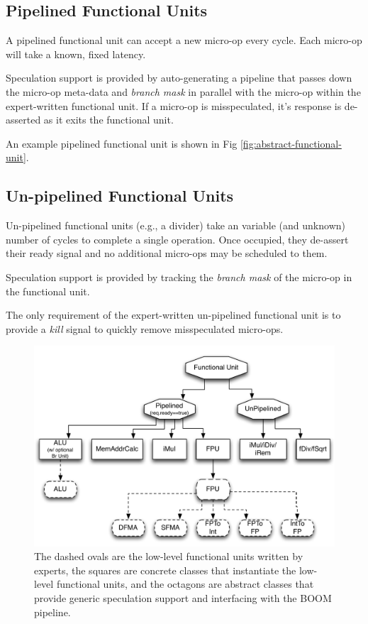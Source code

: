 \subsection{Pipelined Functional Units}

A pipelined functional unit can accept a new micro-op every cycle. Each micro-op will take a known, fixed latency. 

Speculation support is provided by auto-generating a pipeline that passes down the micro-op meta-data and {\em branch mask} in parallel with the micro-op within the expert-written functional unit. If a micro-op is misspeculated, it's response is de-asserted as it exits the functional unit. 

An example pipelined functional unit is shown in Fig \ref{fig:abstract-functional-unit}.

\subsection{Un-pipelined Functional Units}

Un-pipelined functional units (e.g., a divider) take an variable (and unknown) number of cycles to complete a single operation. Once occupied, they de-assert their ready signal and no additional micro-ops may be scheduled to them. 

Speculation support is provided by tracking the {\em branch mask} of the micro-op in the functional unit. 

The only requirement of the expert-written un-pipelined functional unit is to provide a {\em kill} signal to quickly remove misspeculated micro-ops.

\begin{figure}[htbp]
	\centering
	\centerline{\includegraphics[scale =0.75] {figures/functional-unit-hierarchy}}
	\caption{ \small The dashed ovals are the low-level functional units written by experts, the squares are concrete classes that instantiate the low-level functional units, and the octagons are abstract classes that provide generic speculation support and interfacing with the BOOM pipeline.}
	\label{fig:functional-unit-hierarchy}
\end{figure}




